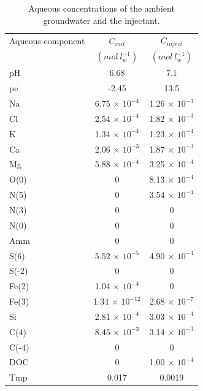 \begin{itemize}
\begin{table}[hb]
\caption{Aqueous concentrations of the ambient groundwater and the injectant.}
\begin{center}
\begin{tabular}{l c c}
\hline
 Aqueous component       & $C_{init}$               & $C_{inject}$      \\
                         & $(mol\ l^{-1}_w)$        & $(mol\ l^{-1}_w)$      \\ \hline
 pH                      &   6.68                   &  7.1            \\
 pe                      &   -2.45                  & 13.5            \\
 Na                      & 6.75 $\times$ $10^{-4}$  & 1.26 $\times$ $10^{-3}$ \\ 
 Cl                      & 2.54 $\times$ $10^{-4}$  & 1.82 $\times$ $10^{-3}$ \\
 K                       & 1.34 $\times$ $10^{-4}$  & 1.23 $\times$ $10^{-4}$ \\
 Ca                      & 2.06 $\times$ $10^{-3}$  & 1.87 $\times$ $10^{-3}$ \\
 Mg                      & 5.88 $\times$ $10^{-4}$  & 3.25 $\times$ $10^{-4}$ \\
 O(0)                    & 0                        & 8.13 $\times$ $10^{-4}$ \\
 N(5)                    & 0                        & 3.54 $\times$ $10^{-4}$ \\
 N(3)                    & 0                        & 0 \\
 N(0)                    & 0                        & 0 \\
 Amm                     & 0                        & 0 \\
 S(6)                    & 5.52 $\times$ $10^{-5}$  & 4.90 $\times$ $10^{-4}$ \\
 S(-2)                   & 0                        & 0 \\
 Fe(2)                   & 1.04 $\times$ $10^{-4}$  & 0 \\
 Fe(3)                   & 1.34 $\times$ $10^{-12}$ & 2.68 $\times$ $10^{-7}$ \\
 Si                      & 2.81 $\times$ $10^{-4}$  & 3.03 $\times$ $10^{-4}$ \\
 C(4)                    & 8.45 $\times$ $10^{-3}$  & 3.14 $\times$ $10^{-3}$ \\
 C(-4)                   & 0                        & 0 \\
 DOC                     & 0                        & 1.00 $\times$ $10^{-4}$ \\
 Tmp                     & 0.017                    & 0.0019 \\ \hline
\end{tabular}
\label{ex_pyr_caqu}
\end{center}
\end{table}
 

\end{itemize}
